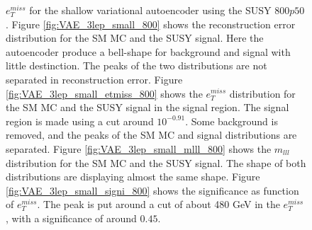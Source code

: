 \begin{figure}[H]
{    $e_T^{miss}$ for the shallow variational autoencoder using the SUSY $800p50$.
    Figure \ref{fig:VAE_3lep_small_800} shows the reconstruction error 
    distribution for the SM MC and the SUSY signal. Here the autoencoder produce a bell-shape for background and 
    signal with little destinction. The peaks of the two distributions are not separated in reconstruction error. Figure \ref{fig:VAE_3lep_small_etmiss_800} 
    shows the $e_T^{miss}$ distribution for the SM MC and the SUSY signal in the signal region. 
    The signal region is made using a cut around $10^{-0.91}$. Some background is removed, and the peaks of the SM MC and signal 
    distributions are separated. Figure \ref{fig:VAE_3lep_small_mlll_800} shows the $m_{lll}$ distribution for the SM MC and the SUSY signal. 
    The shape of both distributions are displaying almost the same shape. Figure \ref{fig:VAE_3lep_small_signi_800} shows the significance as 
    function of $e_T^{miss}$. The peak is put around a cut of about 480 GeV in the $e_T^{miss}$, with a significance of around $0.45$.}
    \label{fig:VAE_3lep_small_rec_sig_signi_800}
\end{figure}


